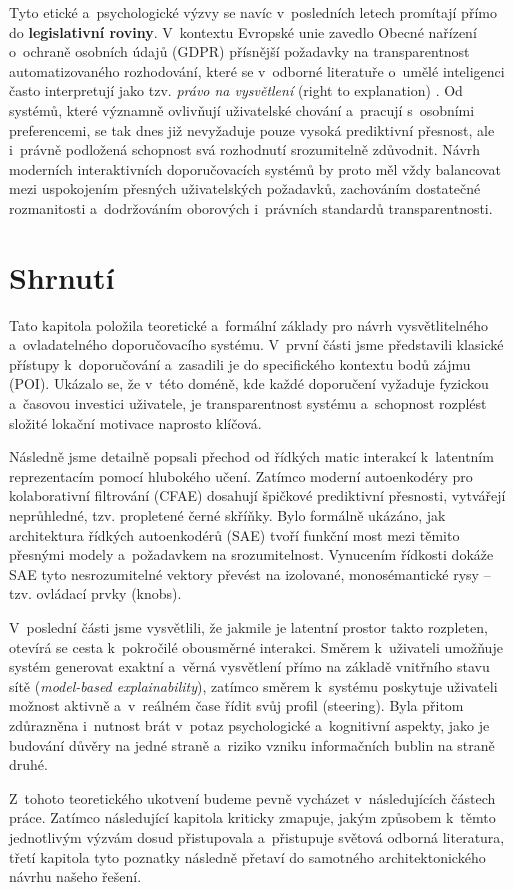 Tyto etické a~psychologické výzvy se navíc v~posledních letech promítají přímo do \textbf{legislativní roviny}. V~kontextu Evropské unie zavedlo Obecné nařízení o~ochraně osobních údajů (GDPR) přísnější požadavky na transparentnost automatizovaného rozhodování, které se v~odborné literatuře o~umělé inteligenci často interpretují jako tzv. \textit{právo na vysvětlení} (right to explanation) \cite{Goodman2017_GDPR, Musto2022_Semantics}. Od systémů, které významně ovlivňují uživatelské chování a~pracují s~osobními preferencemi, se tak dnes již nevyžaduje pouze vysoká prediktivní přesnost, ale i~právně podložená schopnost svá rozhodnutí srozumitelně zdůvodnit. Návrh moderních interaktivních doporučovacích systémů by proto měl vždy balancovat mezi uspokojením přesných uživatelských požadavků, zachováním dostatečné rozmanitosti a~dodržováním oborových i~právních standardů transparentnosti.

\section{Shrnutí}
\label{sec:shrnuti_teorie}

Tato kapitola položila teoretické a~formální základy pro návrh vysvětlitelného a~ovladatelného doporučovacího systému. V~první části jsme představili klasické přístupy k~doporučování a~zasadili je do specifického kontextu bodů zájmu (POI). Ukázalo se, že v~této doméně, kde každé doporučení vyžaduje fyzickou a~časovou investici uživatele, je transparentnost systému a~schopnost rozplést složité lokační motivace naprosto klíčová.

Následně jsme detailně popsali přechod od řídkých matic interakcí k~latentním reprezentacím pomocí hlubokého učení. Zatímco moderní autoenkodéry pro kolaborativní filtrování (CFAE) dosahují špičkové prediktivní přesnosti, vytvářejí neprůhledné, tzv. propletené černé skříňky. Bylo formálně ukázáno, jak architektura řídkých autoenkodérů (SAE) tvoří funkční most mezi těmito přesnými modely a~požadavkem na srozumitelnost. Vynucením řídkosti dokáže SAE tyto nesrozumitelné vektory převést na izolované, monosémantické rysy -- tzv. ovládací prvky (knobs).

V~poslední části jsme vysvětlili, že jakmile je latentní prostor takto rozpleten, otevírá se cesta k~pokročilé obousměrné interakci. Směrem k~uživateli umožňuje systém generovat exaktní a~věrná vysvětlení přímo na základě vnitřního stavu sítě (\textit{model-based explainability}), zatímco směrem k~systému poskytuje uživateli možnost aktivně a~v~reálném čase řídit svůj profil (steering). Byla přitom zdůrazněna i~nutnost brát v~potaz psychologické a~kognitivní aspekty, jako je budování důvěry na jedné straně a~riziko vzniku informačních bublin na straně druhé.

Z~tohoto teoretického ukotvení budeme pevně vycházet v~následujících částech práce. Zatímco následující kapitola kriticky zmapuje, jakým způsobem k~těmto jednotlivým výzvám dosud přistupovala a~přistupuje světová odborná literatura, třetí kapitola tyto poznatky následně přetaví do samotného architektonického návrhu našeho řešení.
